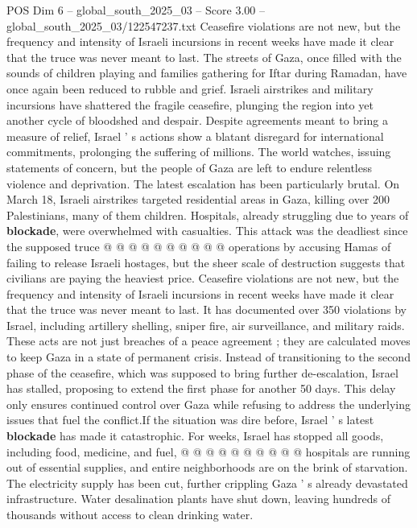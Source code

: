 \begin{textsample}{POS Dim 6 – global\_south\_2025\_03 – Score 3.00 – global\_south\_2025\_03/122547237.txt}  \label{ex:f6_pos_316}
Ceasefire violations are not new, but the frequency and intensity of Israeli incursions in recent weeks have made it clear that the truce was never meant to last.
The streets of Gaza, once filled with the sounds of children playing and families gathering for Iftar during Ramadan, have once again been reduced to rubble and grief.
Israeli airstrikes and military incursions have shattered the fragile ceasefire, plunging the region into yet another cycle of bloodshed and despair.
Despite agreements meant to bring a measure of relief, Israel ' s actions show a blatant disregard for international commitments, prolonging the suffering of millions.
The world watches, issuing statements of concern, but the people of Gaza are left to endure relentless violence and deprivation.
The latest escalation has been particularly brutal.
On March 18, Israeli airstrikes targeted residential areas in Gaza, killing over 200 Palestinians, many of them children.
Hospitals, already struggling due to years of \textbf{blockade}, were overwhelmed with casualties.
This attack was the deadliest since the supposed truce @ @ @ @ @ @ @ @ @ @ operations by accusing Hamas of failing to release Israeli hostages, but the sheer scale of destruction suggests that civilians are paying the heaviest price.
Ceasefire violations are not new, but the frequency and intensity of Israeli incursions in recent weeks have made it clear that the truce was never meant to last.
It has documented over 350 violations by Israel, including artillery shelling, sniper fire, air surveillance, and military raids.
These acts are not just breaches of a peace agreement ; they are calculated moves to keep Gaza in a state of permanent crisis.
Instead of transitioning to the second phase of the ceasefire, which was supposed to bring further de-escalation, Israel has stalled, proposing to extend the first phase for another 50 days.
This delay only ensures continued control over Gaza while refusing to address the underlying issues that fuel the conflict.If the situation was dire before, Israel ' s latest \textbf{blockade} has made it catastrophic.
For weeks, Israel has stopped all goods, including food, medicine, and fuel, @ @ @ @ @ @ @ @ @ @ hospitals are running out of essential supplies, and entire neighborhoods are on the brink of starvation.
The electricity supply has been cut, further crippling Gaza ' s already devastated infrastructure.
Water desalination plants have shut down, leaving hundreds of thousands without access to clean drinking water.

\end{textsample}
